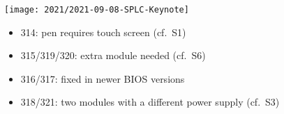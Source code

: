 \begin{frame}{\myframetitle}
	\begin{mycolumns}[widths={80},animation=none]
		\texttt{[image: 2021/2021-09-08-SPLC-Keynote]}
	\mynextcolumn
		\begin{example}{}\setlength\leftmargini{3mm} 
			\begin{itemize}
				\item 314: pen requires touch screen (cf.\ S1)
				\item 315/319/320: extra module needed (cf.\ S6)
				\item 316/317: fixed in newer BIOS versions
				\item 318/321: two modules with a different power supply (cf.\ S3)
			\end{itemize}
		\end{example}
	\end{mycolumns}
\end{frame}



